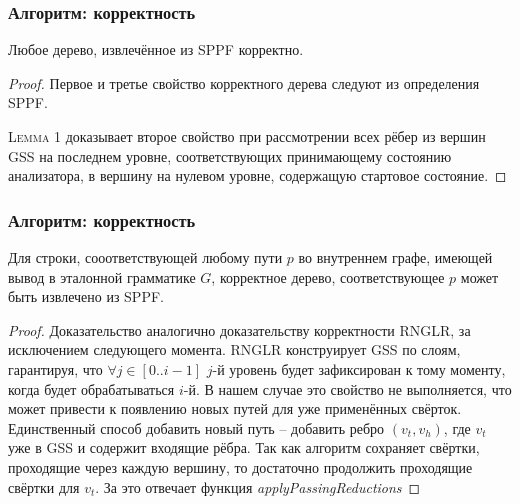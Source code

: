 \documentclass{beamer}
\begin{document}
\begin{frame}
    \transwipe[direction=90]
    \frametitle{Алгоритм: корректность}
    \begin{theorem}
       Любое дерево, извлечённое из SPPF корректно.
    \end{theorem}

    \begin{proof}
      Первое и третье свойство корректного дерева следуют из определения SPPF. 

      \textsc{Lemma 1} доказывает второе свойство при рассмотрении всех рёбер из вершин GSS на последнем уровне, соответствующих принимающему состоянию анализатора, в вершину на 
      нулевом уровне, содержащую стартовое состояние.

    \end{proof}

\end{frame}

\begin{frame}
    \transwipe[direction=90]
    \frametitle{Алгоритм: корректность}
    \begin{theorem}
      Для строки, сооответствующей любому пути $p$ во внутреннем графе, имеющей вывод в эталонной грамматике $G$, корректное дерево, соответствующее $p$ может быть извлечено из SPPF.
    \end{theorem}

    \begin{proof}
Доказательство аналогично доказательству корректности RNGLR, за исключением следующего момента. RNGLR конструирует GSS по слоям, гарантируя, что $\forall j \in [0..i-1]$ $j$-й уровень будет зафиксирован к тому 
моменту, когда будет обрабатываться $i$-й. В нашем случае это свойство не выполняется, что может привести к появлению новых путей для уже применённых свёрток. Единственный способ добавить новый путь --
добавить ребро $(v_{t}, v_{h})$, где $v_{t}$ уже в GSS и содержит входящие рёбра. Так как алгоритм сохраняет свёртки, проходящие через каждую вершину, то достаточно продолжить проходящие свёртки 
для $v_{t}$. За это отвечает функция \emph{applyPassingReductions} 
    \end{proof}

\end{frame}
\end{document}
